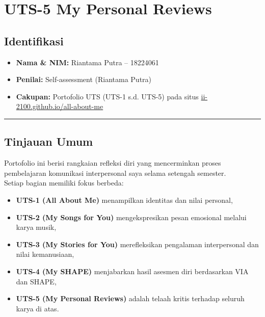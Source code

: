 \documentclass[
  letterpaper,
  DIV=11,
  numbers=noendperiod]{scrreprt}
\providecommand{\tightlist}{%
  \setlength{\itemsep}{0pt}\setlength{\parskip}{0pt}}
\begin{document}

\chapter{UTS-5 My Personal Reviews}\label{uts-5-my-personal-reviews}

\section{Identifikasi}\label{identifikasi}

\begin{itemize}
\tightlist
\item
  \textbf{Nama \& NIM:} Riantama Putra -- 18224061\\
\item
  \textbf{Penilai:} Self-assessment (Riantama Putra)\\
\item
  \textbf{Cakupan:} Portofolio UTS (UTS-1 s.d. UTS-5) pada situs
  \href{https://veinsan.github.io/all-about-me/}{ii-2100.github.io/all-about-me}
\end{itemize}

\begin{center}\rule{0.5\linewidth}{0.5pt}\end{center}

\section{Tinjauan Umum}\label{tinjauan-umum}

Portofolio ini berisi rangkaian refleksi diri yang mencerminkan proses
pembelajaran komunikasi interpersonal saya selama setengah semester.\\
Setiap bagian memiliki fokus berbeda:

\begin{itemize}
\tightlist
\item
  \textbf{UTS-1 (All About Me)} menampilkan identitas dan nilai
  personal,\\
\item
  \textbf{UTS-2 (My Songs for You)} mengekspresikan pesan emosional
  melalui karya musik,\\
\item
  \textbf{UTS-3 (My Stories for You)} merefleksikan pengalaman
  interpersonal dan nilai kemanusiaan,\\
\item
  \textbf{UTS-4 (My SHAPE)} menjabarkan hasil asesmen diri berdasarkan
  VIA dan SHAPE,\\
\item
  \textbf{UTS-5 (My Personal Reviews)} adalah telaah kritis terhadap
  seluruh karya di atas.
\end{itemize}
\end{document}
